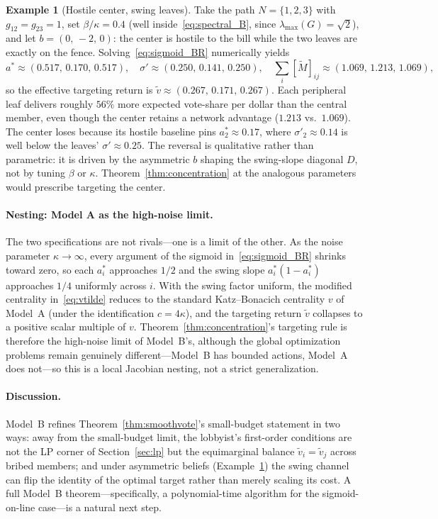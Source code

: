 \documentclass[11pt,letterpaper]{article}
\theoremstyle{plain}
\theoremstyle{definition}
\newtheorem{example}{Example}
\theoremstyle{remark}
\begin{document}
\begin{example}[Hostile center, swing leaves]\label{ex:case4}
Take the path $N = \{1,2,3\}$ with $g_{12}=g_{23}=1$, set $\beta/\kappa = 0.4$ (well inside~\eqref{eq:spectral_B}, since $\lambda_{\max}(G) = \sqrt{2}$), and let $b = (0,\, -2,\, 0)$: the center is hostile to the bill while the two leaves are exactly on the fence. Solving~\eqref{eq:sigmoid_BR} numerically yields
\[
a^* \approx (0.517,\, 0.170,\, 0.517), \quad \sigma' \approx (0.250,\, 0.141,\, 0.250), \quad \textstyle\sum_i[\tilde M]_{ij} \approx (1.069,\, 1.213,\, 1.069),
\]
so the effective targeting return is $\tilde v \approx (0.267,\, 0.171,\, 0.267)$. Each peripheral leaf delivers roughly $56\%$ more expected vote-share per dollar than the central member, even though the center retains a network advantage ($1.213$ vs.\ $1.069$). The center loses because its hostile baseline pins $a_2^* \approx 0.17$, where $\sigma'_2 \approx 0.14$ is well below the leaves' $\sigma' \approx 0.25$. The reversal is qualitative rather than parametric: it is driven by the asymmetric $b$ shaping the swing-slope diagonal $D$, not by tuning $\beta$ or $\kappa$. Theorem~\ref{thm:concentration} at the analogous parameters would prescribe targeting the center.
\end{example}

\paragraph{Nesting: Model A as the high-noise limit.} The two specifications are not rivals---one is a limit of the other. As the noise parameter $\kappa \to \infty$, every argument of the sigmoid in~\eqref{eq:sigmoid_BR} shrinks toward zero, so each $a_i^*$ approaches $1/2$ and the swing slope $a_i^*(1 - a_i^*)$ approaches $1/4$ uniformly across $i$. With the swing factor uniform, the modified centrality in~\eqref{eq:vtilde} reduces to the standard Katz--Bonacich centrality $v$ of Model~A (under the identification $c = 4\kappa$), and the targeting return $\tilde v$ collapses to a positive scalar multiple of $v$. Theorem~\ref{thm:concentration}'s targeting rule is therefore the high-noise limit of Model~B's, although the global optimization problems remain genuinely different---Model~B has bounded actions, Model~A does not---so this is a local Jacobian nesting, not a strict generalization.

\paragraph{Discussion.} Model~B refines Theorem~\ref{thm:smoothvote}'s small-budget statement in two ways: away from the small-budget limit, the lobbyist's first-order conditions are not the LP corner of Section~\ref{sec:lp} but the equimarginal balance $\tilde v_i = \tilde v_j$ across bribed members; and under asymmetric beliefs (Example~\ref{ex:case4}) the swing channel can flip the identity of the optimal target rather than merely scaling its cost. A full Model~B theorem---specifically, a polynomial-time algorithm for the sigmoid-on-line case---is a natural next step.
\end{document}
